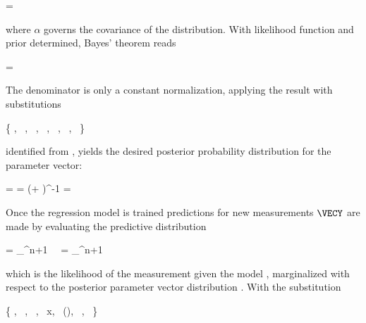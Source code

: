     \startformula
        \RPRIOR = \GAUSS{\VECW}{\VECZERO}{\ALPHAI \MATID}
    \stopformula

    where $\alpha$ governs the covariance of the distribution. With likelihood
    function and prior determined, Bayes' theorem reads

    \startformula
        \RPOSTERIOR = \frac{\RLIKELIHOOD \, \RPRIOR}{\RNORMALIZATION} \EQSTOP
    \stopformula

    The denominator is only a constant normalization, applying the result
     with substitutions

    \startformula
        \{ \VECX \rightarrow \VECW,~
            \VECA \rightarrow \VECZERO,~
            \MATP \rightarrow \alpha \MATID,~
            \VECY \rightarrow \VECX,~
            \MATB \rightarrow \MATPHI,~
            \VECB \rightarrow \VECZERO,~
            \MATQ \rightarrow \beta \MATID
            \} \EQCOMMA
    \stopformula

    identified from , yields the desired posterior
    probability distribution for the parameter vector:

    \placesubformula
    \startformula
    \startalign[n=2,align={right,left}]
        \NC \RPOSTERIOR = \NC \GAUSS{\VECW}{\MEANVEC}{\COVMAT} 
        \NC \COVMAT = \NC (\beta \MATPHIT \MATPHI + \alpha \MATID)^{-1} 
        \NC \MEANVEC = \NC \beta \COVMAT \MATPHIT \VECX \EQSTOP {}
    \stopalign
    \stopformula
    \stopsubformulas

    Once the regression model is trained predictions for new measurements
    $\VECY$ are made by evaluating the predictive distribution

    \startformula
    \startalign[n=2,align={right,left}]
        \NC \RPREDICT = \NC
            \int_{\REALS^{n+1}}  \,
            \RPOSTERIOR \, \diff \VECW \NR
        \NC = \NC
            \int_{\REALS^{n+1}}  \,
                \GAUSS{\VECW}{\MEANVEC}{\COVMAT} \,\diff \VECW \NR
    \stopalign
    \stopformula
    
    which is the likelihood of the measurement given the model
    , marginalized with respect to the posterior
    parameter vector distribution . With the
    substitution

    \startformula
        \{ \VECX \rightarrow \VECW,~
            \VECA \rightarrow \MEANVEC,~
            \MATP \rightarrow \COVMATI,~
            \VECY \rightarrow x,~
            \MATB \rightarrow \VECPHI(\VECY),~
            \VECB {},~
            \MATQ \rightarrow \beta \}
    \stopformula

